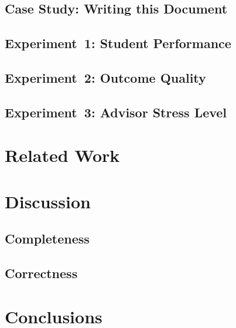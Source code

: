 \documentclass[a4paper]{memoir}
\begin{document}
\section{Case Study: Writing this Document}
\label{sec:case-study}

\section{Experiment~1: Student Performance}
\label{sec:exp:performance}

\section{Experiment~2: Outcome Quality}
\label{sec:exp:quality}

\section{Experiment~3: Advisor Stress Level}
\label{sec:exp:stress}


\chapter{Related Work}
\label{cha:related-work}

%
%
%
%
%
%
%
%
%


\chapter{Discussion}
\label{cha:discussion}

\section{Completeness}
\label{sec:completeness}

\section{Correctness}
\label{sec:correctness}


\chapter{Conclusions}
\label{cha:conclusions}


\clearpage

\backmatter

\printbibliography

\appendix
\end{document}
